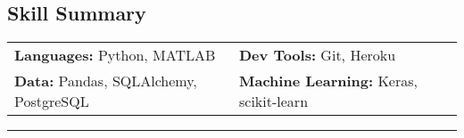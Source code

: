 \documentclass[10pt,letterpaper]{article}
\newenvironment{indentsection}[1]%
{\begin{list}{}%
	{\setlength{\leftmargin}{#1}}%
	\item[]%
}
{\end{list}}
\begin{document}
\subsection*{Skill Summary}
\begin{indentsection}{\parindent}
\begin{tabular}{p{0.5\linewidth}   p{0.5\linewidth} } 

\textbf{Languages:}  Python, MATLAB 			& \textbf{Dev Tools:}  Git, Heroku \\  
\textbf{Data:} Pandas, SQLAlchemy, PostgreSQL 	& \textbf{Machine Learning:}  Keras, scikit-learn  \\





\end{tabular}
\end{indentsection}


\hrule
\vspace{-0.4em}
\end{document}
